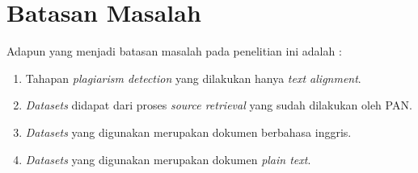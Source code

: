 \documentclass[../Book, Implementasi Algoritma Merging Context Seeds untuk Plagiarism Detection.tex]{subfiles}
\begin{document}
	\section{Batasan Masalah}
	\noindent Adapun yang menjadi batasan masalah pada penelitian ini adalah :
		\begin{enumerate}
			\item Tahapan \textit{plagiarism detection} yang dilakukan hanya \textit{text alignment}.
			\item \textit{Datasets} didapat dari proses \textit{source retrieval} yang sudah dilakukan oleh PAN\cite{pan-task-2014}.
			\item \textit{Datasets} yang digunakan merupakan dokumen berbahasa inggris. 
			\item \textit{Datasets} yang digunakan merupakan dokumen \textit{plain text}.
		\end{enumerate}
\end{document}
